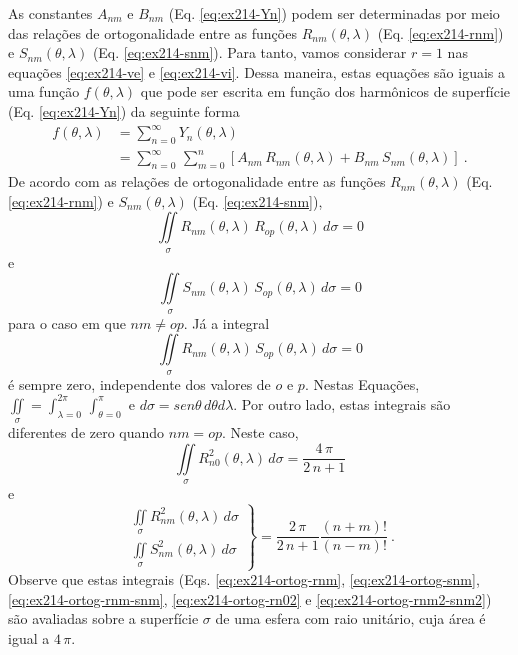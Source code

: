 \documentclass[10pt,a4paper,fleqn]{article}
\begin{document}
As constantes $A_{nm}$ e $B_{nm}$ (Eq. \ref{eq:ex214-Yn}) podem ser determinadas por meio das relaç\~{o}es de ortogonalidade entre as
funç\~{o}es $R_{nm}(\theta, \lambda)$ (Eq. \ref{eq:ex214-rnm}) e $S_{nm}(\theta, \lambda)$ (Eq. \ref{eq:ex214-snm}). Para tanto, vamos
considerar $r = 1$ nas equaç\~{o}es \ref{eq:ex214-ve} e \ref{eq:ex214-vi}. Dessa maneira, estas equaç\~{o}es s\~{a}o iguais a uma funç\~{a}o 
$f(\theta,\lambda)$ que pode ser escrita em funç\~{a}o dos harm\^{o}nicos de superf\'{i}cie (Eq. \ref{eq:ex214-Yn}) da seguinte forma
\begin{equation}
\begin{split}
f(\theta,\lambda) & = \sum_{n=0}^{\infty} 
Y_{n}(\theta, \lambda) \\
& = \sum_{n=0}^{\infty} \,
\sum_{m=0}^{n} \left[ 
A_{nm} \, R_{nm}(\theta, \lambda) +
B_{nm} \, S_{nm}(\theta, \lambda)
\right] \: .
\end{split}
\label{eq:ex214-f}
\end{equation}
De acordo com as relaç\~{o}es de ortogonalidade entre as funç\~{o}es $R_{nm}(\theta, \lambda)$ (Eq. \ref{eq:ex214-rnm}) e 
$S_{nm}(\theta, \lambda)$ (Eq. \ref{eq:ex214-snm}),
\begin{equation}
\iint \limits_{\sigma}
R_{nm}(\theta, \lambda) \, R_{op}(\theta, \lambda) \, d \sigma  = 0
\label{eq:ex214-ortog-rnm}
\end{equation}
e
\begin{equation}
\iint \limits_{\sigma}
S_{nm}(\theta, \lambda) \, S_{op}(\theta, \lambda) \, d \sigma = 0
\label{eq:ex214-ortog-snm}
\end{equation}
para o caso em que $nm \neq op$. J\'{a} a integral
\begin{equation}
\iint \limits_{\sigma}
R_{nm}(\theta, \lambda) \, S_{op}(\theta, \lambda) \, d \sigma  = 0
\label{eq:ex214-ortog-rnm-snm}
\end{equation}
\'{e} sempre zero, independente dos valores de $o$ e $p$. Nestas Equaç\~{o}es, 
$\iint \limits_{\sigma} = \int_{\lambda = 0}^{2\pi} \, \int_{\theta = 0}^{\pi}$ e $d 
\sigma = sen\theta \, d\theta d\lambda$. Por outro lado, estas integrais s\~{a}o diferentes 
de zero quando $nm = op$. Neste caso,
\begin{equation}
\iint \limits_{\sigma}
R_{n0}^{2}(\theta, \lambda) \, d \sigma  = \dfrac{4 \, \pi}{2 \, n + 1}
\label{eq:ex214-ortog-rn02}
\end{equation}
e
\begin{equation}
\left.
\begin{array}{l}
\iint \limits_{\sigma}
R_{nm}^{2}(\theta, \lambda) \, d \sigma \\
\iint \limits_{\sigma}
S_{nm}^{2}(\theta, \lambda) \, d \sigma
\end{array}
\right \} =
\dfrac{2 \, \pi}{2 \, n + 1} \dfrac{(n + m)!}{(n - m)!} \: .
\label{eq:ex214-ortog-rnm2-snm2}
\end{equation}
Observe que estas integrais (Eqs. \ref{eq:ex214-ortog-rnm}, \ref{eq:ex214-ortog-snm}, \ref{eq:ex214-ortog-rnm-snm},
\ref{eq:ex214-ortog-rn02} e \ref{eq:ex214-ortog-rnm2-snm2}) s\~{a}o avaliadas sobre a superf\'{i}cie $\sigma$ de uma esfera
com raio unit\'{a}rio, cuja \'{a}rea \'{e} igual a $4 \, \pi$.
\end{document}
